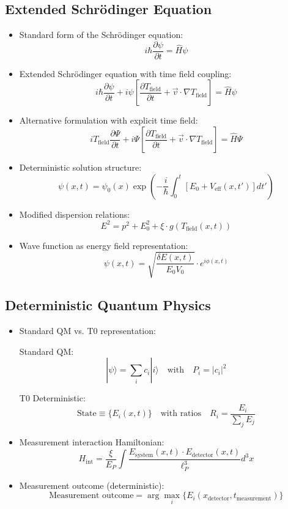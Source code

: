 \documentclass[12pt,a4paper]{article}
\begin{document}
	\subsection{Extended Schrödinger Equation}
	\begin{itemize}
		\item Standard form of the Schrödinger equation:
		$$i\hbar \frac{\partial \psi}{\partial t} = \hat{H}\psi$$
		
		\item Extended Schrödinger equation with time field coupling:
		$$\boxed{i\hbar \frac{\partial\psi}{\partial t} + i\psi\left[\frac{\partial T_{\text{field}}}{\partial t} + \vec{v} \cdot \nabla T_{\text{field}}\right] = \hat{H}\psi}$$
		
		\item Alternative formulation with explicit time field:
		$$\boxed{i T_{\text{field}} \frac{\partial\Psi}{\partial t} + i\Psi\left[\frac{\partial T_{\text{field}}}{\partial t} + \vec{v} \cdot \nabla T_{\text{field}}\right] = \hat{H}\Psi}$$
		
		\item Deterministic solution structure:
		$$\psi(x,t) = \psi_0(x) \exp\left(-\frac{i}{\hbar} \int_0^t \left[E_0 + V_{\text{eff}}(x,t')\right] dt'\right)$$
		
		\item Modified dispersion relations:
		$$E^2 = p^2 + E_0^2 + \xi \cdot g(T_{\text{field}}(x,t))$$
		
		\item Wave function as energy field representation:
		$$\psi(x,t) = \sqrt{\frac{\delta E(x,t)}{E_0 V_0}} \cdot e^{i\phi(x,t)}$$
	\end{itemize}
	
	\subsection{Deterministic Quantum Physics}
	\begin{itemize}
		\item Standard QM vs. T0 representation:
		
		Standard QM: $$|\psi\rangle = \sum_i c_i |i\rangle \quad \text{with} \quad P_i = |c_i|^2$$
		
		T0 Deterministic: $$\text{State} \equiv \{E_i(x,t)\} \quad \text{with ratios} \quad R_i = \frac{E_i}{\sum_j E_j}$$
		
		\item Measurement interaction Hamiltonian:
		$$H_{\text{int}} = \frac{\xi}{E_P} \int \frac{E_{\text{system}}(x,t) \cdot E_{\text{detector}}(x,t)}{\ell_P^3} d^3x$$
		
		\item Measurement outcome (deterministic):
		$$\text{Measurement outcome} = \arg\max_i\{E_i(x_{\text{detector}}, t_{\text{measurement}})\}$$
	\end{itemize}
	
\end{document}
